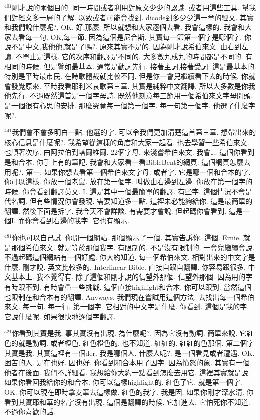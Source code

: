 \documentclass{book}
\begin{document}
$^{401}$剛才說的兩個目的.
同一時間或者利用對原文少少的認識.
或者用這些工具.
幫我們對經文多一層的了解.
以致或者可能會找到.
dicode到多少少這一章的經文.
其實和我們說什麼呢?.
OK.
好,那麼.
所以就想和大家逐個去看.
我會這樣的.
我會和大家去看每一句.
OK,每一節.
因為這個是尼合斯.
其實每一節第一個字是哪個字.
你說不是中文,我他他,就是了嗎?.
原來其實不是的.
因為剛才說希伯來文.
由右到左讀.
不單止是這樣.
它的次序和翻譯是不同的.
大多數九成九的時間都是不同的.
有相同的時候.
但是譬如最基本.
通常是動詞先行.
接著主詞,接著受詞.
這是最基本的.
特別是平時最市民.
在詩歌體裁就比較不同.
但是你一會兒繼續看下去的時候.
你就會發覺原來.
平時我看耶利米哀歌第三章.
其實是純粹中文翻譯.
所以大多數是你我他先行.
不過既然這首是一個字母詩.
既然他刻意每三節用一個希伯來文字母開頭.
是一個很有心思的安排.
那麼究竟每一個第一個字.
每一句第一個字.
他選了什麼字呢?.

$^{441}$我們會不會多明白一點.
他選的字.
可以令我們更加清楚這首第三章.
想帶出來的核心信息是什麼呢?.
我希望從這樣的角度和大家一起看.
也去學習一些希伯來文.
也順著次序.
由阿拉伯到塔爾維爾.
22個字母.
來淺嘗希伯來文.
我會….
這個你看到是和合本.
你手上有的筆記.
我會和大家看一看BibleBent的網頁.
這個網頁怎麼去用呢?.
第一.
如果你想去看第一個希伯來文字母.
或者字.
它是哪一個和合本的字.
你可以這樣.
你放一個老鼠.
放在第一個字.
叫做由右邊到左邊.
你放在第一個字的時候.
你會看到翻譯英文.
I.
這是其中一個最簡單的翻譯.
有些字.
這個情況不會是代名詞.
但有些情況你會發現.
需要知道多一點.
這裡未必能夠給你.
這是最簡單的翻譯.
然後下面是拆字.
我今天不會詳談.
有需要才會說.
但起碼你會看到.
這是一個I.
而你會看到右邊的我字.
它也有顯示.

$^{481}$你也可以自己試.
你開一個網站.
那個顯示了一個.
其實告訴你.
這個.
Ernie.
就是那個希伯來文.
就是等於那個我字.
有限制的.
不是沒有限制的.
一會兒繼續會說.
不過起碼這個網站有一個好處.
你大約知道.
每一個希伯來文.
相對出來的中文字是什麼.
剛才說.
英文比較多的.
Interlinear Bible.
直接自跟自翻譯.
你容易跟很多.
中文基本上.
我不覺得有.
除了這個和剛才說的信望外那個.
信望外那個.
因為用的字有時跟不到.
有時會帶一些挑戰.
這個直接highlight和合本.
你可以跟到.
當然這個也限制在和合本有的翻譯.
Anyways.
我們現在嘗試用這個方法.
去找出每一個希伯來文.
每一句.
每一行.
第一個字.
它相對的中文字是什麼.
你看到.
這個是我的字.
它說什麼呢.
如果很快地逐個字翻譯.

$^{521}$你看到其實是我.
事其實沒有出現.
為什麼呢?.
因為它沒有動詞.
簡單來說.
它紅色的就是動詞.
或者橙色.
紅色橙色的.
也不知道.
紅紅的.
紅紅的色那個.
第二個字其實是我.
其實這裡有一個der.
我是哪個人.
什麼人呢?.
是一個看見或者遭遇.
OK.
困苦的人.
是在也好.
因也好.
你看到和合本用了因字.
因為憤怒的象.
其實有一個他者在後面.
我們不詳細看.
我想給你大約一點看到怎麼去用它.
這裡其實就是說.
如果你看回我給你的和合本.
你可以這樣highlight的.
紅色了它.
就是第一個字.
OK.
你可以現在即時拿支筆去這樣做.
紅色的我字.
我是因.
如果你剛才深水清.
你看到其實耶和華的名字沒有出現.
這個是翻譯的時候.
它加進去.
它怕死你不知道.
不過你喜歡的話.
\end{document}
